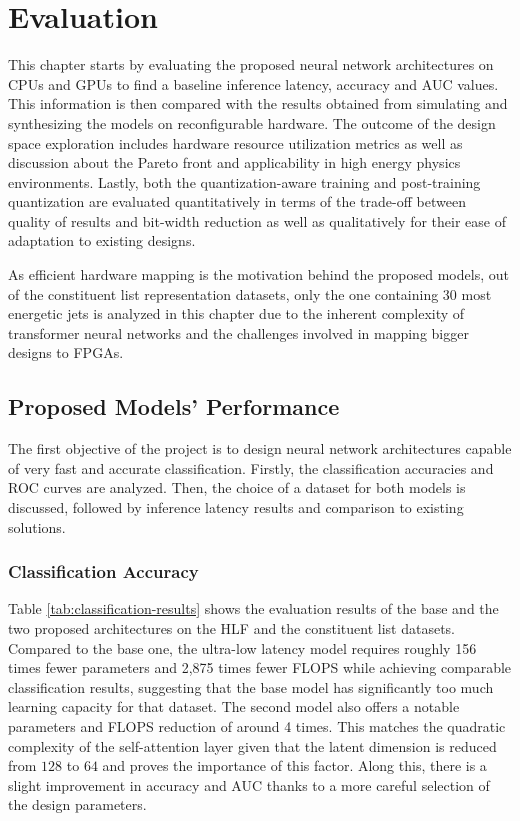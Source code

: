 \chapter{Evaluation}\label{evaluation}
This chapter starts by evaluating the proposed neural network architectures on CPUs and GPUs to find a baseline inference latency, accuracy and AUC values. This information is then compared with the results obtained from simulating and synthesizing the models on reconfigurable hardware. The outcome of the design space exploration includes hardware resource utilization metrics as well as discussion about the Pareto front and applicability in high energy physics environments. Lastly, both the quantization-aware training and post-training quantization are evaluated quantitatively in terms of the trade-off between quality of results and bit-width reduction as well as qualitatively for their ease of adaptation to existing designs.

As efficient hardware mapping is the motivation behind the proposed models, out of the constituent list representation datasets, only the one containing 30 most energetic jets is analyzed in this chapter due to the inherent complexity of transformer neural networks and the challenges involved in mapping bigger designs to FPGAs.

\section{Proposed Models' Performance}
The first objective of the project is to design neural network architectures capable of very fast and accurate classification. Firstly, the classification accuracies and ROC curves are analyzed. Then, the choice of a dataset for both models is discussed, followed by inference latency results and comparison to existing solutions.

\subsection{Classification Accuracy}
Table \ref{tab:classification-results} shows the evaluation results of the base and the two proposed architectures on the HLF and the constituent list datasets. Compared to the base one, the ultra-low latency model requires roughly 156 times fewer parameters and 2,875 times fewer FLOPS while achieving comparable classification results, suggesting that the base model has significantly too much learning capacity for that dataset. The second model also offers a notable parameters and FLOPS reduction of around 4 times. This matches the quadratic complexity of the self-attention layer given that the latent dimension is reduced from \(128\) to \(64\) and proves the importance of this factor. Along this, there is a slight improvement in accuracy and AUC thanks to a more careful selection of the design parameters.

